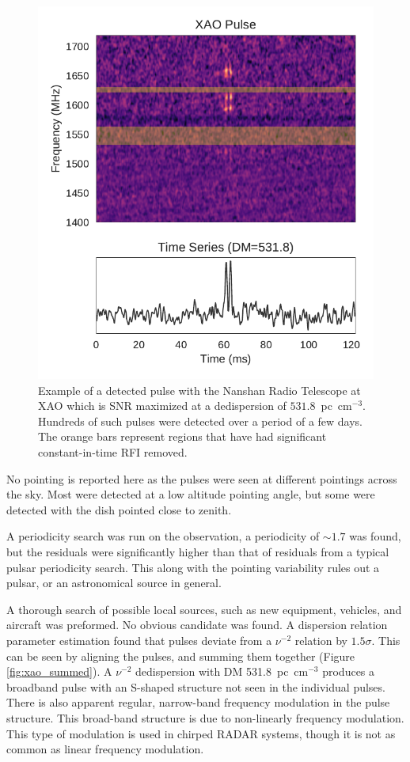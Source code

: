 \documentclass[a4paper,fleqn,usenatbib]{mnras}
\begin{document}
\begin{figure}
    \includegraphics[width=1.0\linewidth]{figures/XAO_pulse_dynamic.pdf}
    \caption{Example of a detected pulse with the Nanshan Radio Telescope at XAO
    which is SNR maximized at a dedispersion of $531.8$~pc~cm$^{-3}$. Hundreds
    of such pulses were detected over a period of a few days. The orange bars
    represent regions that have had significant constant-in-time RFI removed.
    }
    \label{fig:xao_dynamic}
\end{figure}

No pointing is reported here as the pulses were seen at different pointings
across the sky. Most were detected at a low altitude pointing angle, but some
were detected with the dish pointed close to zenith.

A periodicity search was run on the observation, a periodicity of $\sim 1.7$ was
found, but the residuals were significantly higher than that of residuals from a
typical pulsar periodicity search. This along with the pointing variability
rules out a pulsar, or an astronomical source in general.

A thorough search of possible local sources, such as new equipment, vehicles,
and aircraft was preformed. No obvious candidate was found. A dispersion
relation parameter estimation found that pulses deviate from a $\nu^{-2}$
relation by $1.5 \sigma$. This can be seen by aligning the pulses, and summing
them together (Figure \ref{fig:xao_summed}). A $\nu^{-2}$ dedispersion with DM
531.8~pc~cm$^{-3}$ produces a broadband pulse with an S-shaped structure not
seen in the individual pulses. There is also apparent regular, narrow-band
frequency modulation in the pulse structure. This broad-band structure is due to
non-linearly frequency modulation. This type of modulation is used in chirped
RADAR systems, though it is not as common as linear frequency modulation.
\end{document}

